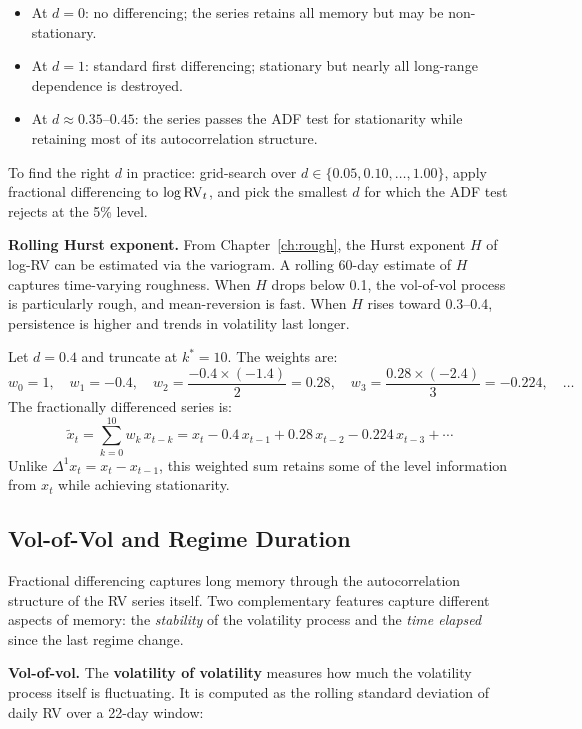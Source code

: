 \begin{itemize}[nosep]
  \item At $d = 0$: no differencing; the series retains all memory but may be non-stationary.
  \item At $d = 1$: standard first differencing; stationary but nearly all long-range dependence is destroyed.
  \item At $d \approx 0.35$--$0.45$: the series passes the ADF test for stationarity while retaining most of its autocorrelation structure.
\end{itemize}

To find the right $d$ in practice: grid-search over $d \in \{0.05, 0.10, \ldots, 1.00\}$, apply fractional differencing to $\log \operatorname{RV}_t$, and pick the smallest $d$ for which the ADF test rejects at the 5\% level.

\textbf{Rolling Hurst exponent.}
From Chapter~\ref{ch:rough}, the Hurst exponent $H$ of log-RV can be estimated via the variogram.
A rolling 60-day estimate of $H$ captures time-varying roughness.
When $H$ drops below 0.1, the vol-of-vol process is particularly rough, and mean-reversion is fast.
When $H$ rises toward 0.3--0.4, persistence is higher and trends in volatility last longer.

\begin{workedexample}
Let $d = 0.4$ and truncate at $k^* = 10$.
The weights are:
\[
w_0 = 1, \quad w_1 = -0.4, \quad w_2 = \frac{-0.4 \times (-1.4)}{2} = 0.28, \quad w_3 = \frac{0.28 \times (-2.4)}{3} = -0.224, \quad \ldots
\]
The fractionally differenced series is:
\[
\tilde{x}_t = \sum_{k=0}^{10} w_k \, x_{t-k} = x_t - 0.4\, x_{t-1} + 0.28\, x_{t-2} - 0.224\, x_{t-3} + \cdots
\]
Unlike $\Delta^1 x_t = x_t - x_{t-1}$, this weighted sum retains some of the level information from $x_t$ while achieving stationarity.
\end{workedexample}

\subsection{Vol-of-Vol and Regime Duration}\label{sec:feat-vov-regime}

Fractional differencing captures long memory through the autocorrelation structure of the RV series itself.
Two complementary features capture different aspects of memory: the \emph{stability} of the volatility process and the \emph{time elapsed} since the last regime change.

\textbf{Vol-of-vol.}
The \textbf{volatility of volatility} measures how much the volatility process itself is fluctuating.
It is computed as the rolling standard deviation of daily RV over a 22-day window:

